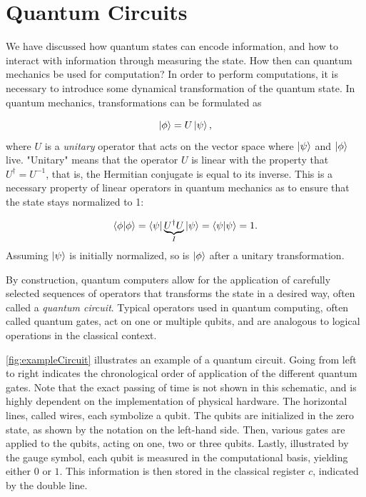 \section{Quantum Circuits}\label{sec:QuantumCircuits}
We have discussed how quantum states can encode information, and how to interact with information through measuring the state. How then can quantum mechanics be used for computation? In order to perform computations, it is necessary to introduce some dynamical transformation of the quantum state. In quantum mechanics, transformations can be formulated as 

\begin{equation}\label{eq:UnitaryEvolution}
 \ket{\phi} = U\ket{\psi},
\end{equation}
where $U$ is a \emph{unitary} operator that acts on the vector space where $\ket{\psi}$ and $\ket{\phi}$ live. "Unitary" means that the operator $U$ is linear with the property that $U^{\dagger} = U^{-1}$, that is, the Hermitian conjugate is equal to its inverse. This is a necessary property of linear operators in quantum mechanics as to ensure that the state stays normalized to 1:

\begin{equation}\label{eq:UnitaryEvolution}
 \braket{\phi}{\phi} = \bra{\psi}\underset{I}{\underbrace{U^{\dagger}U}}\ket{\psi} = \bra{\psi}\ket{\psi} =1.
\end{equation}
Assuming $\ket{\psi}$ is initially normalized, so is $\ket{\phi}$ after a unitary transformation.

By construction, quantum computers allow for the application of carefully selected sequences of operators that transforms the state in a desired way, often called a \emph{quantum circuit}. Typical operators used in quantum computing, often called quantum gates, act on one or multiple qubits, and are analogous to logical operations in the classical context. 

\autoref{fig:exampleCircuit} illustrates an example of a quantum circuit. Going from left to right indicates the chronological order of application of the different quantum gates. Note that the exact passing of time is not shown in this schematic, and is highly dependent on the implementation of physical hardware. The horizontal lines, called wires, each symbolize a qubit. The qubits are initialized in the zero state, as shown by the notation on the left-hand side. Then, various gates are applied to the qubits, acting on one, two or three qubits. Lastly, illustrated by the gauge symbol, each qubit is measured in the computational basis, yielding either $0$ or $1$. This information is then stored in the classical register $c$, indicated by the double line. 

